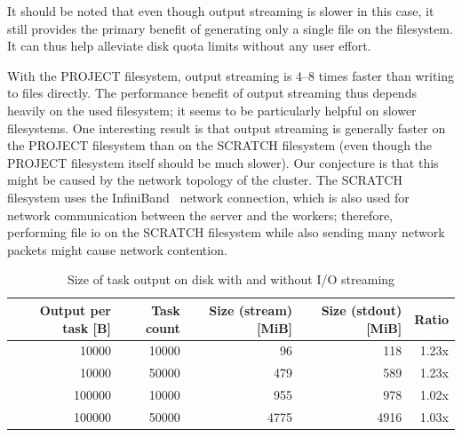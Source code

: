 It should be noted that even though output streaming is slower in this case, it still provides the
primary benefit of generating only a single file on the filesystem. It can thus help alleviate disk
quota limits without any user effort.

With the PROJECT filesystem, output streaming is $4$--$8$
times faster than writing to files directly. The performance benefit of output streaming thus
depends heavily on the used filesystem; it seems to be particularly helpful on slower filesystems.
One interesting result is that output streaming is generally faster on the PROJECT filesystem than
on the SCRATCH filesystem (even though the PROJECT filesystem itself should be much slower). Our
conjecture is that this might be caused by the network topology of the cluster. The SCRATCH
filesystem uses the InfiniBand~\cite{infiniband} network connection, which is also used for
network communication between the server and the workers; therefore, performing file
\gls{io} on the SCRATCH filesystem while also sending many network packets might
cause network contention.

\begin{table}[h]
	\centering
	\begin{tabular}{|r|r|r|r|r|}
		\hline
		Output per task [B] & Task count & Size (stream) [MiB] & Size (stdout) [MiB] & Ratio \\ \hline
		10000               & 10000      & 96                  & 118                 & 1.23x \\ \hline
		10000               & 50000      & 479                 & 589                 & 1.23x \\ \hline
		100000              & 10000      & 955                 & 978                 & 1.02x \\ \hline
		100000              & 50000      & 4775                & 4916                & 1.03x \\ \hline
	\end{tabular}
	\caption{Size of task output on disk with and without I/O streaming}
	\label{tab:hq-io-streaming-size}
\end{table}

